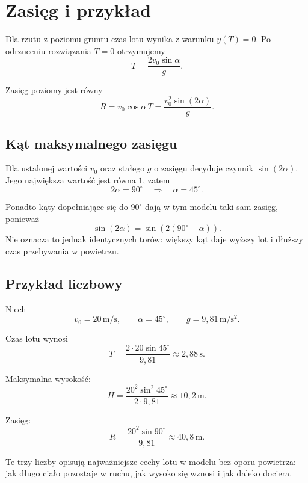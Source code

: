 \section{Zasięg i przykład}

Dla rzutu z poziomu gruntu czas lotu wynika z warunku \(y(T)=0\). Po
odrzuceniu rozwiązania \(T=0\) otrzymujemy
\[
T=\frac{2v_0\sin\alpha}{g}.
\]

Zasięg poziomy jest równy
\[
R=v_0\cos\alpha\,T
 =\frac{v_0^2\sin(2\alpha)}{g}.
\]

\subsection{Kąt maksymalnego zasięgu}

Dla ustalonej wartości \(v_0\) oraz stałego \(g\) o zasięgu decyduje czynnik
\(\sin(2\alpha)\). Jego największa wartość jest równa \(1\), zatem
\[
2\alpha=90^\circ
\quad\Longrightarrow\quad
\alpha=45^\circ.
\]

Ponadto kąty dopełniające się do \(90^\circ\) dają w tym modelu taki sam
zasięg, ponieważ
\[
\sin(2\alpha)=\sin\left(2(90^\circ-\alpha)\right).
\]
Nie oznacza to jednak identycznych torów: większy kąt daje wyższy lot i
dłuższy czas przebywania w powietrzu.

\subsection{Przykład liczbowy}

Niech
\[
v_0=20\,\mathrm{m/s},
\qquad
\alpha=45^\circ,
\qquad
g=9{,}81\,\mathrm{m/s^2}.
\]

Czas lotu wynosi
\[
T=\frac{2\cdot20\sin45^\circ}{9{,}81}
 \approx 2{,}88\,\mathrm{s}.
\]

Maksymalna wysokość:
\[
H=\frac{20^2\sin^2 45^\circ}{2\cdot9{,}81}
 \approx 10{,}2\,\mathrm{m}.
\]

Zasięg:
\[
R=\frac{20^2\sin90^\circ}{9{,}81}
 \approx 40{,}8\,\mathrm{m}.
\]

Te trzy liczby opisują najważniejsze cechy lotu w modelu bez oporu powietrza:
jak długo ciało pozostaje w ruchu, jak wysoko się wznosi i jak daleko dociera.

